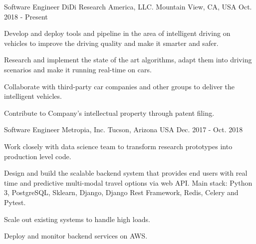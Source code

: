 

\begin{cventries}

  \cventry
    {Software Engineer} %
    {DiDi Research America, LLC.} %
    {Mountain View, CA, USA} %
    {Oct. 2018 - Present} %
    {
      \begin{cvitems} %
      \item {Develop and deploy tools and pipeline in the area of intelligent driving on vehicles to improve the driving quality and make it smarter and safer.}
      \item {Research and implement the state of the art algorithms, adapt them into driving scenarios and make it running real-time on cars.}
      \item {Collaborate with third-party car companies and other groups to deliver the intelligent vehicles.}
      \item {Contribute to Company’s intellectual property through patent filing.}
      \end{cvitems}
    }

  \cventry
    {Software Engineer} %
    {Metropia, Inc.} %
    {Tucson, Arizona USA} %
    {Dec. 2017 - Oct. 2018} %
    {
      \begin{cvitems} %
      \item {Work closely with data science team to transform
    research prototypes into production level code.}
       \item {Design and build the scalable backend system that provides end users
    with real time and predictive multi-modal travel options via web
    API. Main stack: Python 3, PostgreSQL, Sklearn, Django, Django Rest Framework,
    Redis, Celery and Pytest.}
       \item {Scale out existing systems to handle high loads.}
       \item {Deploy and monitor backend services on AWS.}
      \end{cvitems}
    }


\end{cventries}
